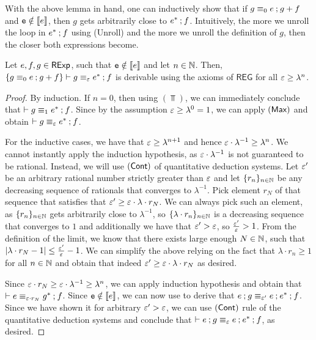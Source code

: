 With the above lemma in hand, one can inductively show that if $g \equiv_0 e \mathbin{;} g + f$ and $\mathtt{e} \notin \left\llbracket{e}\right\rrbracket$, then $g$ gets arbitrarily close to $e^\ast \mathbin{;} f$. Intuitively, the more we unroll the loop in $e^\ast \mathbin{;} f$ using \textsf{(Unroll)} and the more we unroll the definition of $g$, then the closer both expressions become.
\begin{lemma}\label{c2:lem:star_lemma}
Let $e,f,g \in \mathsf{RExp}$, such that $\mathtt{e} \notin \left\llbracket{e}\right\rrbracket$ and let $n \in \mathbb{N}$. Then, $ \{g \equiv_0 e \mathbin{;} g  + f\} \vdash g \equiv_{\varepsilon} e^{\ast} \mathbin{;} f$ is derivable using the axioms of $\mathsf{REG}$ for all $\varepsilon \geq \lambda^n $.
\end{lemma}
\begin{proof}
	By induction. If $n = 0$, then using $(\Top)$, we can immediately conclude that $\vdash g \equiv_1 e^{\ast} \mathbin{;} f$. Since by the assumption $\varepsilon \geq \lambda^0 = 1$, we can apply $(\textsf{Max})$ and obtain $\vdash g \equiv_{\varepsilon} e^\ast \mathbin{;} f $. 
	
	For the inductive cases, we have that $\varepsilon \geq \lambda^{n+1}$ and hence $\varepsilon \cdot \lambda^{-1} \geq \lambda^n $. We cannot instantly apply the induction hypothesis, as $\varepsilon \cdot \lambda^{-1}$ is not guaranteed to be rational. Instead, we will use $(\textsf{Cont})$ of quantitative deduction systems. Let $\varepsilon'$ be an arbitrary rational number strictly greater than $\varepsilon$ and let $\{r_n\}_{n \in \mathbb{N}}$ be any decreasing sequence of rationals that converges to $\lambda^{-1}$. Pick element $r_N$ of that sequence that satisfies that $\varepsilon' \geq \varepsilon \cdot \lambda \cdot r_N$. We can always pick such an element, as $\{r_n\}_{n \in \mathbb{N}}$ gets arbitrarily close to $\lambda^{-1}$, so $\{\lambda \cdot r_n\}_{n \in \mathbb{N}}$ is a decreasing sequence that converges to $1$ and additionally we have that $\varepsilon' > \varepsilon$, so $\frac{\varepsilon'}{\varepsilon} >1$.	From the definition of the limit, we know that there exists large enough $N \in \mathbb{N}$, such that $|\lambda \cdot r_{N}-1| \leq \frac{\varepsilon'}{\varepsilon} - 1$. We can simplify the above relying on the fact that $\lambda \cdot r_n \geq 1$ for all $n \in \mathbb{N}$ and obtain that indeed $\varepsilon' \geq \varepsilon \cdot \lambda \cdot r_N$ as desired. 
	
		Since $\varepsilon \cdot r_N \geq \varepsilon \cdot \lambda^{-1} \geq \lambda^{n}$, we can apply induction hypothesis and obtain that $\vdash e \equiv_{\varepsilon \cdot r_N} g^* \mathbin{;} f$. Since $\mathtt{e} \notin \left\llbracket{e}\right\rrbracket$, we can now use  to derive that $e \mathbin{;} g \equiv_{\varepsilon'} e \mathbin{;} e^{\ast} \mathbin{;} f$. Since we have shown it for arbitrary $\varepsilon' > \varepsilon$, we can use $(\textsf{Cont})$ rule of the quantitative deduction systems and conclude that $\vdash e \mathbin{;} g \equiv_{\varepsilon} e \mathbin{;} e^* \mathbin{;} f$, as desired. 
		

\end{proof}
